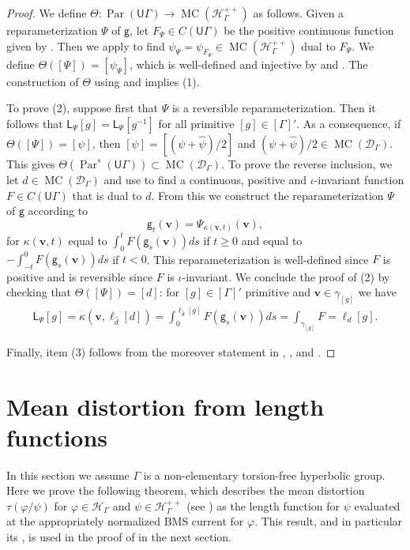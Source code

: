 \documentclass[twoside]{amsart}
\theoremstyle{definition}
\numberwithin{equation}{section}
\numberwithin{theorem}{section}
\newcommand{\msf}[1]{\mathsf{#1}}
\newcommand{\calD}{\mathcal{D}}
\newcommand{\calH}{\mathcal{H}}
\newcommand{\scrH}{\mathscr{H}}
\newcommand{\G}{\Gamma}
\newcommand{\gam}{\gamma}
\newcommand{\Thet}{\Theta}
\renewcommand{\k}{\kappa}
\newcommand{\p}{\psi}
\DeclareMathOperator{\Par}{Par}
\newcommand{\ra}{\rightarrow}
\newcommand{\vv}{\mathbf{v}}
\newcommand{\UG}{\msf{U}\G}
\DeclareMathOperator{\MC}{MC}
\newcommand{\vg}{\msf{g}}
\newcommand{\sfP}{\mathsf{\Psi}}
\begin{document}
\begin{proof}
    We define $\Thet :\Par(\UG)\ra \MC(\scrH_\G^{++})$ as follows. Given a reparameterization $\sfP$ of $\vg$, let $F_{\sfP}\in C(\UG)$ be the positive continuous function given by . Then we apply  to find $\p_\sfP=\psi_{F_{\sfP}}\in \MC(\calH_\G^{++})$ dual to $F_\sfP$. We define $\Thet([\sfP])=[\p_\sfP]$, which is well-defined and injective by  and . The construction of $\Thet$ using  and   implies (1).

    To prove (2), suppose first that $\sfP$ is a reversible reparameterization. Then it follows that $\msf{L}_{\sfP}[g]=\msf{L}_{\sfP}[g^{-1}]$ for all primitive $[g]\in [\G]'$. As a consequence, if $\Theta([\sfP])=[\p]$, then $[\p]=[(\p+\hat\p)/2]$ and $(\p+\hat\p)/2\in \MC(\calD_\G)$. This gives $\Thet(\Par^s(\UG))\subset \MC(\calD_\G)$. To prove the reverse inclusion, we let $d\in \MC(\calD_\G)$ and use  to find a continuous, positive and $\iota$-invariant function $F\in C(\UG)$ that is dual to $d$. From this we construct the reparameterization $\sfP$ of $\msf{g}$ according to 
    \[\vg_{t}(\vv)=\sfP_{\k(\vv,t)}(\vv),\]
    for $\k(\vv,t)$ equal to $\int_0^t{F(\vg_s(\vv))ds}$ if $t\geq 0$ and equal to $-\int_{-t}^0{F(\vg_s(\vv))ds}$ if $t<0$.
    This reparameterization is well-defined since $F$ is positive and is reversible since $F$ is $\iota$-invariant. We conclude the proof of (2) by checking that $\Thet([\sfP])=[d]$: for $[g]\in [\G]'$ primitive and $\vv\in \gam_{[g]}$ we have
    \begin{align*}
    \msf{L}_{\sfP}[g]=\k(\vv,\ell_{\hat d}[d])=\int_{0}^{\ell_{\hat d}[g]}{F(\vg_s(\vv))ds}=\int_{\gam_{[g]}}F=\ell_{d}[g].    
    \end{align*}

    Finally, item (3) follows from the moreover statement in , , and .
\end{proof}




\section{Mean distortion from length functions}
\label{sec:meandistortion_length}
In this section we assume $\G$ is a non-elementary torsion-free hyperbolic group. 
Here we prove the following theorem, which describes the mean distortion $\tau(\varphi/\p)$ for $\varphi\in \calH_\G$ and $\p\in \calH_\G^{++}$ (see ) as the length function for $\p$ evaluated at the appropriately normalized BMS current for $\varphi$. This result, and in particular its , is used in the proof of  in the next section.
\end{document}
